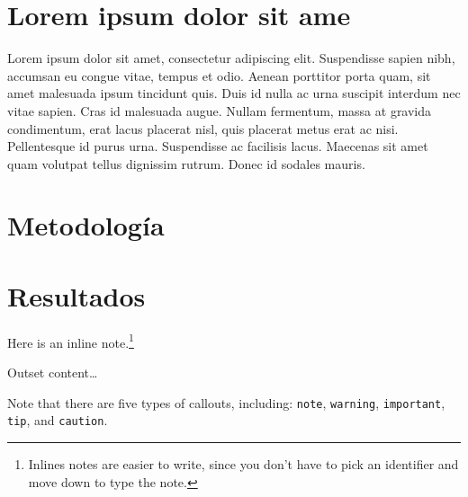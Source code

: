 \documentclass[
  12pt,
  letterpaper,
  DIV=11,
  numbers=noendperiod,
  oneside]{scrreport}
\begin{document}
\newpage


\chapter{Lorem ipsum dolor sit ame}\label{lorem-ipsum-dolor-sit-ame}

Lorem ipsum dolor sit amet, consectetur adipiscing elit. Suspendisse
sapien nibh, accumsan eu congue vitae, tempus et odio. Aenean porttitor
porta quam, sit amet malesuada ipsum tincidunt quis. Duis id nulla ac
urna suscipit interdum nec vitae sapien. Cras id malesuada augue. Nullam
fermentum, massa at gravida condimentum, erat lacus placerat nisl, quis
placerat metus erat ac nisi. Pellentesque id purus urna. Suspendisse ac
facilisis lacus. Maecenas sit amet quam volutpat tellus dignissim
rutrum. Donec id sodales mauris.


\chapter{Metodología}\label{sec-metodologia}


\chapter{Resultados}\label{sec-Resultados}

Here is an inline note.\footnote{Inlines notes are easier to write,
  since you don't have to pick an identifier and move down to type the
  note.}

Outset content\ldots{}

\begin{tcolorbox}[enhanced jigsaw, toprule=.15mm, opacitybacktitle=0.6, title=\textcolor{quarto-callout-note-color}{\faInfo}\hspace{0.5em}{Nota}, colbacktitle=quarto-callout-note-color!10!white, opacityback=0, breakable, arc=.35mm, toptitle=1mm, leftrule=.75mm, bottomrule=.15mm, titlerule=0mm, coltitle=black, colframe=quarto-callout-note-color-frame, left=2mm, bottomtitle=1mm, colback=white, rightrule=.15mm]

Note that there are five types of callouts, including: \texttt{note},
\texttt{warning}, \texttt{important}, \texttt{tip}, and
\texttt{caution}.

\end{tcolorbox}
\end{document}
